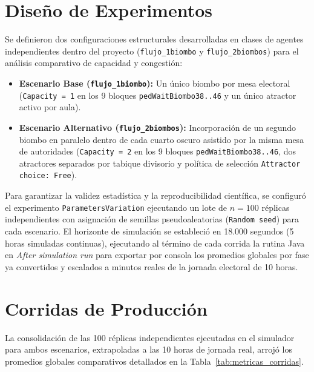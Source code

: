 \documentclass[11pt,a4paper]{article}
\begin{document}
\section{Diseño de Experimentos}
Se definieron dos configuraciones estructurales desarrolladas en clases de agentes independientes dentro del proyecto (\texttt{flujo\_1biombo} y \texttt{flujo\_2biombos}) para el análisis comparativo de capacidad y congestión:
\begin{itemize}
    \item \textbf{Escenario Base (\texttt{flujo\_1biombo}):} Un único biombo por mesa electoral (\texttt{Capacity = 1} en los 9 bloques \texttt{pedWaitBiombo38..46} y un único atractor activo por aula).
    \item \textbf{Escenario Alternativo (\texttt{flujo\_2biombos}):} Incorporación de un segundo biombo en paralelo dentro de cada cuarto oscuro asistido por la misma mesa de autoridades (\texttt{Capacity = 2} en los 9 bloques \texttt{pedWaitBiombo38..46}, dos atractores separados por tabique divisorio y política de selección \texttt{Attractor choice: Free}).
\end{itemize}

Para garantizar la validez estadística y la reproducibilidad científica, se configuró el experimento \texttt{ParametersVariation} ejecutando un lote de $n = 100$ réplicas independientes con asignación de semillas pseudoaleatorias (\texttt{Random seed}) para cada escenario. El horizonte de simulación se estableció en 18.000 segundos (5 horas simuladas continuas), ejecutando al término de cada corrida la rutina Java en \textit{After simulation run} para exportar por consola los promedios globales por fase ya convertidos y escalados a minutos reales de la jornada electoral de 10 horas.

\section{Corridas de Producción}
La consolidación de las 100 réplicas independientes ejecutadas en el simulador para ambos escenarios, extrapoladas a las 10 horas de jornada real, arrojó los promedios globales comparativos detallados en la Tabla~\ref{tab:metricas_corridas}.
\end{document}
